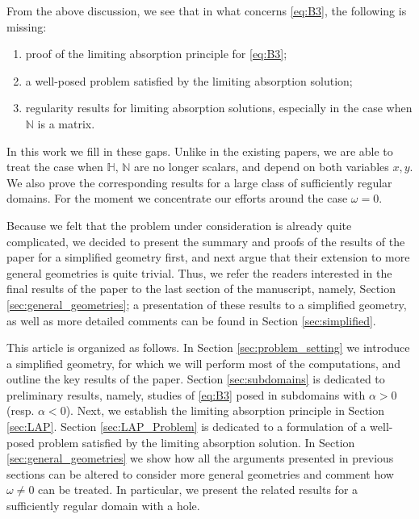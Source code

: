 \documentclass[report]{elsarticle}
\numberwithin{theorem}{section}
\begin{document}
From the above discussion, we see that in what concerns \eqref{eq:B3}, the following is missing:
\begin{enumerate}
	\item proof of the limiting absorption principle for \eqref{eq:B3};
	\item a well-posed problem satisfied by the limiting absorption solution;
	\item regularity results for limiting absorption solutions, especially in the case when $\mathbb{N}$ is a matrix.
\end{enumerate}
In this work we fill in these gaps. %
Unlike in the existing papers, we are able to treat the case when $\mathbb{H}, \, \mathbb{N}$ are no longer scalars, and depend on both variables $x, y$. We also prove the corresponding results for a large class of sufficiently regular domains. For the moment we concentrate our efforts around the case $\omega=0$. 


Because we felt that the problem under consideration is already quite complicated, we decided to present the summary and proofs of the results of the paper for a simplified geometry first, and next argue that their extension to more general geometries is quite trivial. Thus, we refer the readers interested in the final results of the paper to the last section of the manuscript, namely, Section \ref{sec:general_geometries}; a presentation of these results to a simplified geometry, as well as more detailed comments can be found in Section \ref{sec:simplified}.  

This article is organized as follows. In Section \ref{sec:problem_setting} we introduce a simplified geometry, for which we will perform most of the computations, and outline the key results of the paper. Section \ref{sec:subdomains} is dedicated to preliminary results, namely, studies of \eqref{eq:B3} posed in subdomains with $\alpha>0$ (resp. $\alpha<0$). Next, we establish the limiting absorption principle in Section \ref{sec:LAP}. Section \ref{sec:LAP_Problem} is dedicated to a formulation of a well-posed problem satisfied by the limiting absorption solution. In Section \ref{sec:general_geometries} we show how all the arguments presented in previous sections can be altered to consider more general geometries and comment how $\omega\neq 0$ can be treated. In particular, we present the related results for a sufficiently regular domain with a hole.
\end{document}

